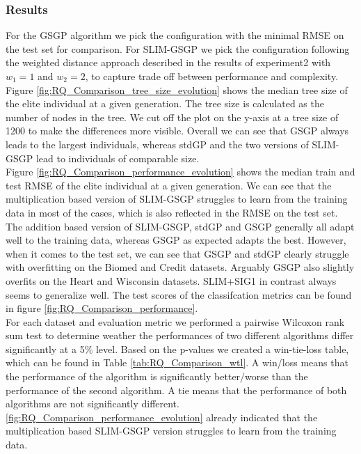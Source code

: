 \documentclass[manuscript, review, anonymous]{acmart} %
\begin{document}
\subsubsection{Results}
For the GSGP algorithm we pick the configuration with the minimal RMSE on the test set for comparison.
For SLIM-GSGP we pick the configuration following the weighted distance approach described in the results of experiment2 with $w_1 = 1$ and $w_2 = 2$, 
to capture trade off between performance and complexity.\\
Figure \ref{fig:RQ_Comparison_tree_size_evolution} shows the median tree size of the elite
individual at a given generation.
The tree size is calculated as the number of nodes
in the tree. We cut off the plot on the
y-axis at a tree size of 1200 to make the
differences more visible.
Overall we can see that GSGP always leads to the
largest individuals, whereas stdGP and the two versions of SLIM-GSGP
lead to individuals of comparable size.\\ %
Figure \ref{fig:RQ_Comparison_performance_evolution} shows the median train and test RMSE of the elite individual
at a given generation.
We can see that the multiplication based version of SLIM-GSGP
struggles to learn from the training data in most of
the cases,
which is also reflected in the RMSE on the test
set. The addition based version of SLIM-GSGP, stdGP and GSGP
generally all adapt well to the training data,
whereas GSGP as expected adapts the best.
However, when it comes to the test set, we can see that GSGP and stdGP clearly struggle with overfitting 
on the Biomed and Credit datasets. Arguably GSGP also slightly overfits on the Heart and Wisconsin datasets.
SLIM+SIG1 in contrast always seems to generalize well. The test scores of the classifcation metrics can be found in figure
\ref{fig:RQ_Comparison_performance}.\\
For each dataset and evaluation metric we performed a pairwise
Wilcoxon rank sum test to determine weather the performances
of two different algorithms differ significantly at a 5\% level.
Based on the p-values we created a win-tie-loss table, which
can be found in Table \ref{tab:RQ_Comparison_wtl}.
A win/loss means that the performance of the algorithm is
significantly better/worse than the performance of the second algorithm.
A tie means that the performance of both algorithms are
not significantly different.
\ref{fig:RQ_Comparison_performance_evolution} already indicated that the multiplication based SLIM-GSGP version 
struggles to learn from the training data.
\end{document}

